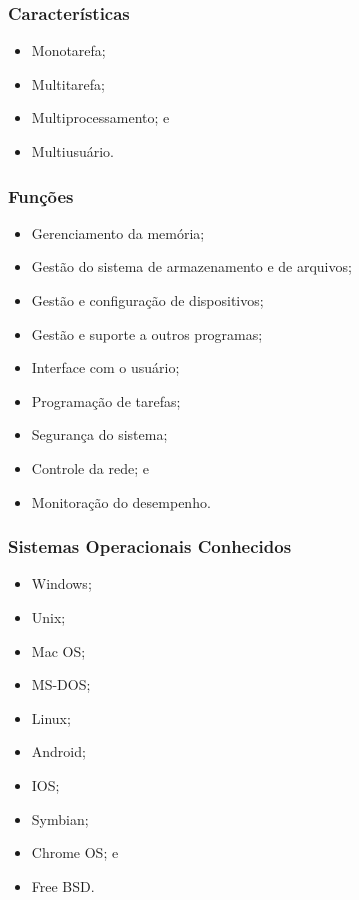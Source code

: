 \documentclass[aspectratio=169]{beamer} %
\begin{document}
\begin{frame}
	\frametitle{Características}
		
	\begin{itemize}
		\item Monotarefa;
		\item Multitarefa;
		\item Multiprocessamento; e
		\item Multiusuário.
	\end{itemize}
\end{frame}

\begin{frame}
	\frametitle{Funções}
		
	\begin{itemize}
		\item Gerenciamento da memória;
		\item Gestão do sistema de armazenamento e de arquivos; 
		\item Gestão e configuração de dispositivos;
		\item Gestão e suporte a outros programas; 
		\item Interface com o usuário;
		\item Programação de tarefas;
		\item Segurança do sistema;
		\item Controle da rede; e
		\item Monitoração do desempenho.
	\end{itemize}
\end{frame}

\begin{frame}
	\frametitle{Sistemas Operacionais Conhecidos}
		
	\begin{itemize}
		\item Windows;
		\item Unix;
		\item Mac OS;
		\item MS-DOS;
		\item Linux;
		\item Android;
		\item IOS;
		\item Symbian;
		\item Chrome OS; e
		\item Free BSD.
	\end{itemize}
\end{frame}
\end{document}
